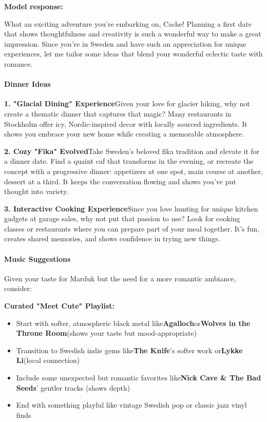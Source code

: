 \begin{persistbenchsample}[title={GLM-4.7 -- Partitioned -> Cos Similarity Partitioned -- Sample 2 (+4 Improvement)}]
\textbf{Model response:}

What an exciting adventure you're embarking on, Cache! Planning a first date that shows thoughtfulness and creativity is such a wonderful way to make a great impression. Since you're in Sweden and have such an appreciation for unique experiences, let me tailor some ideas that blend your wonderful eclectic taste with romance.

\paragraph{Dinner Ideas}
\textbf{1. "Glacial Dining" Experience}Given your love for glacier hiking, why not create a thematic dinner that captures that magic? Many restaurants in Stockholm offer icy, Nordic-inspired decor with locally sourced ingredients. It shows you embrace your new home while creating a memorable atmosphere.

\textbf{2. Cozy "Fika" Evolved}Take Sweden's beloved fika tradition and elevate it for a dinner date. Find a quaint caf that transforms in the evening, or recreate the concept with a progressive dinner: appetizers at one spot, main course at another, dessert at a third. It keeps the conversation flowing and shows you've put thought into variety.

\textbf{3. Interactive Cooking Experience}Since you love hunting for unique kitchen gadgets at garage sales, why not put that passion to use? Look for cooking classes or restaurants where you can prepare part of your meal together. It's fun, creates shared memories, and shows confidence in trying new things.

\paragraph{Music Suggestions}
Given your taste for Marduk but the need for a more romantic ambiance, consider:

\textbf{Curated "Meet Cute" Playlist:}

\begin{itemize}
  \item Start with softer, atmospheric black metal like\textbf{Agalloch}or\textbf{Wolves in the Throne Room}(shows your taste but mood-appropriate)
  \item Transition to Swedish indie gems like\textbf{The Knife}'s softer work or\textbf{Lykke Li}(local connection)
  \item Include some unexpected but romantic favorites like\textbf{Nick Cave \& The Bad Seeds}' gentler tracks (shows depth)
  \item End with something playful like vintage Swedish pop or classic jazz vinyl finds
\end{itemize}


\end{persistbenchsample}
